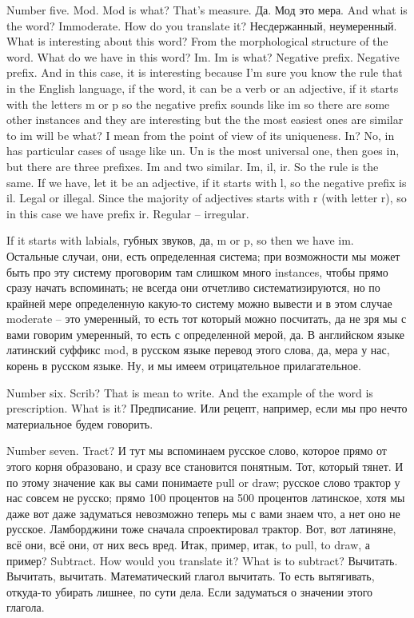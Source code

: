 \documentclass[main.tex]{subfiles}
\begin{document}
Number five.
Mod.
Mod is what?
That's measure.
Да.
Мод это мера.
And what is the word? Immoderate.
How do you translate it? Несдержанный, неумеренный.
What is interesting about this word?
From the morphological structure of the word.
What do we have in this word? Im.
Im is what? Negative prefix.
Negative prefix.
And in this case, it is interesting because I'm sure you know the rule that in the English language, if the word, it can be a verb or an adjective, if it starts with the letters m or p so the negative prefix sounds like im so there are some other instances and they are interesting but the the most easiest ones are similar to im will be what? I mean from the point of view of its uniqueness.
In? No, in has particular cases of usage like un.
Un is the most universal one, then goes in, but there are three prefixes.
Im and two similar.
Im, il, ir.
So the rule is the same.
If we have, let it be an adjective, if it starts with l, so the negative prefix is il.
Legal or illegal.
Since the majority of adjectives starts with r (with letter r), so in this case we have prefix ir.
Regular -- irregular.

If it starts with labials, губных звуков, да, m or p, so then we have im.
Остальные случаи, они, есть определенная система; при возможности мы может быть про эту систему проговорим там слишком много instances, чтобы прямо сразу начать вспоминать; не всегда они отчетливо систематизируются, но по крайней мере определенную какую-то систему можно вывести и в этом случае moderate -- это умеренный, то есть тот который можно посчитать, да не зря мы с вами говорим умеренный, то есть с определенной мерой, да.
В английском языке латинский суффикс mod, в русском языке перевод этого слова, да, мера у нас, корень в русском языке.
Ну, и мы имеем отрицательное прилагательное.

Number six. Scrib?
That is mean to write.
And the example of the word is prescription.
What is it? Предписание.
Или рецепт, например, если мы про нечто материальное будем говорить.

Number seven. Tract?
И тут мы вспоминаем русское слово, которое прямо от этого корня образовано, и сразу все становится понятным.
Тот, который тянет.
И по этому значение как вы сами понимаете pull or draw; русское слово трактор у нас совсем не русско; прямо 100 процентов на 500 процентов латинское, хотя мы даже вот даже задуматься невозможно теперь мы с вами знаем что, а нет оно не русское.
Ламборджини тоже сначала спроектировал трактор.
Вот, вот латиняне, всё они, всё они, от них весь вред.
Итак, пример, итак, to pull, to draw, а пример? Subtract.
How would you translate it? What is to subtract? Вычитать.
Вычитать, вычитать.
Математический глагол вычитать.
То есть вытягивать, откуда-то убирать лишнее, по сути дела.
Если задуматься о значении этого глагола.
\end{document}
